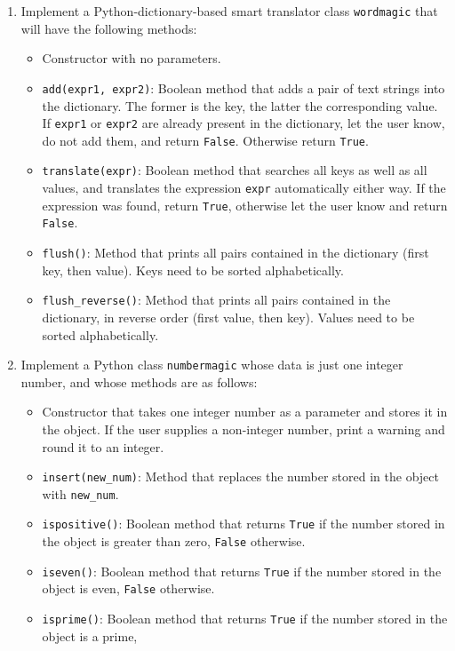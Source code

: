 \begin{enumerate}
\item Implement a Python-dictionary-based smart translator class {\tt wordmagic} that 
      will have the following methods:
\begin{itemize}
\item Constructor with no parameters.
\item {\tt add(expr1, expr2)}: Boolean method that adds a pair of text strings into 
      the dictionary. The former is the key, the latter the corresponding value. 
      If {\tt expr1} or {\tt expr2} are already present in the dictionary,
      let the user know, do not add them, and return {\tt False}. Otherwise return {\tt True}.
\item {\tt translate(expr)}: Boolean method that searches all keys as well as all values,
      and translates the expression {\tt expr} automatically either way. If the expression 
      was found, return {\tt True}, otherwise let the user know and return {\tt False}.
\item {\tt flush()}: Method that prints all pairs contained in the dictionary (first key, then value).
      Keys need to be sorted alphabetically.
\item {\tt flush\_reverse()}: Method that prints all pairs contained in the dictionary, in
      reverse order (first value, then key). Values need to be sorted alphabetically.
\end{itemize}
\item Implement a Python class {\tt numbermagic} whose data is just one integer number, and 
      whose methods are as follows:
\begin{itemize}
\item Constructor that takes one integer number as a parameter and stores it in the object. 
      If the user supplies a non-integer number, print a warning and round it to an integer. 
\item {\tt insert(new\_num)}: Method that replaces the number stored in the object with {\tt new\_num}.
\item {\tt ispositive()}: Boolean method that returns {\tt True} if the number stored in the object is 
      greater than zero, {\tt False} otherwise.
\item {\tt iseven()}: Boolean method that returns {\tt True} if the number stored in the object is even,
      {\tt False} otherwise.
\item {\tt isprime()}: Boolean method that returns {\tt True} if the number stored in the object is a prime,

\end{itemize}
\end{enumerate}
